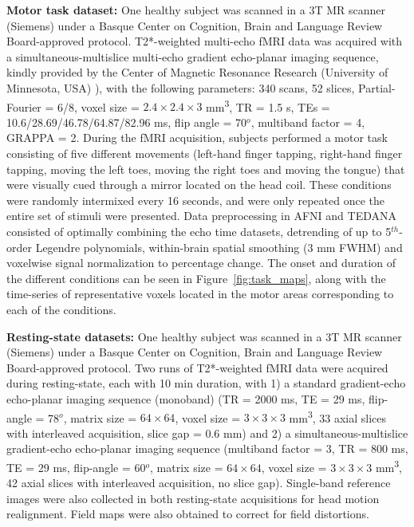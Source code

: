 \textbf{Motor task dataset:} One healthy subject was scanned in a 3T MR scanner (Siemens) under a Basque Center on Cognition, Brain and Language Review Board-approved protocol. T2*-weighted multi-echo fMRI data was acquired with a simultaneous-multislice multi-echo gradient echo-planar imaging sequence, kindly provided by the Center of Magnetic Resonance Research (University of Minnesota, USA) ), with the following parameters: 340 scans, 52 slices, Partial-Fourier = 6/8, voxel size = $2.4\times2.4\times3$ mm\textsuperscript{3}, TR = 1.5 s, TEs = 10.6/28.69/46.78/64.87/82.96 ms, flip angle = 70\(^o\), multiband factor = 4, GRAPPA = 2. During the fMRI acquisition, subjects performed a motor task consisting of five different movements (left-hand finger tapping, right-hand finger tapping, moving the left toes, moving the right toes and moving the tongue) that were visually cued through a mirror located on the head coil. These conditions were randomly intermixed every 16 seconds, and were only repeated once the entire set of stimuli were presented. Data preprocessing in AFNI and TEDANA consisted of optimally combining the echo time datasets, detrending of up to 5\(^{th}\)-order Legendre polynomials, within-brain spatial smoothing (3 mm FWHM) and voxelwise signal normalization to percentage change. The onset and duration of the different conditions can be seen in Figure~\ref{fig:task_maps}, along with the time-series of representative voxels located in the motor areas corresponding to each of the conditions.

\textbf{Resting-state datasets:} One healthy subject was scanned in a 3T MR scanner (Siemens) under a Basque Center on Cognition, Brain and Language Review Board-approved protocol. Two runs of T2*-weighted fMRI data were acquired during resting-state, each with 10 min duration, with 1) a standard gradient-echo echo-planar imaging sequence (monoband) (TR = 2000 ms, TE = 29 ms, flip-angle = 78\(^o\), matrix size = $64\times64$, voxel size = $3\times3\times3$ mm\textsuperscript{3}, 33 axial slices with interleaved acquisition, slice gap = 0.6 mm) and 2) a  simultaneous-multislice gradient-echo echo-planar imaging sequence (multiband factor = 3, TR = 800 ms, TE = 29 ms, flip-angle = 60\(^o\), matrix size = $64\times64$, voxel size = $3\times3\times3$ mm\textsuperscript{3}, 42 axial slices with interleaved acquisition, no slice gap). Single-band reference images were also collected in both resting-state acquisitions for head motion realignment. Field maps were also obtained to correct for field distortions.

